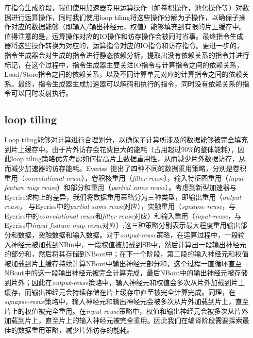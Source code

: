 在指令生成阶段，我们使用加速器专用运算操作（如卷积操作，池化操作等）对数据进行运算操作，同时我们使用loop tiling将这些操作分解为子操作，以确保子操作对应的数据能够（即输入/输出神经元，权值）能够填充到有限的片上缓存中。值得注意的是，运算操作对应的IO操作和访存操作会被同时省事。最终指令生成器将这些操作转换为对应的，运算指令对应的IO指令和访存指令。更进一步的，指令生成器会对生成的指令进行静态依赖分析，提取出没有依赖关系的指令并进行标记，在这个过程中，指令生成器主要关注IO指令与计算指令之间的依赖关系，Load/Store指令之间的依赖关系，以及不同计算单元对应的计算指令之间的依赖关系。最终，指令生成器生成加速器可以解码和执行的指令，同时没有依赖关系的指令可以同时发射执行。

\subsection{loop tiling}

Loop tiling能够对计算进行合理划分，以确保子计算所涉及的数据能够被完全填充到片上缓存中。由于片外访存会花费巨大的能耗（占用超过$90\%$的整体能耗），因此loop tiling策略优先考虑如何提高片上数据重用性，从而减少片外数据访存，从而减少加速器的访存能耗。Eyeriss~\cite{chen2017eyeriss}提出了四种不同的数据重用策略，分别是卷积重用（\emph{convolutional reuse}），卷积核重用（\emph{filter reuse}），输入特征图重用（\emph{input feature map reuse}）和部分和重用（\emph{partial sums reuse}）。考虑到新型加速器与Eyeriss架构上的差异，我们将数据重用策略分为三种类型，即输出重用（\emph{output-reuse}， 与Eyeriss中的\emph{partial sums reuse}对应），突触重用（\emph{synapse-reuse}，与Eyeriss中的\emph{convolutional reuse}和\emph{filter reuse}对应）和输入重用（\emph{input-reuse}，与Eyeriss中\emph{input feature map resue}对应）;这三种策略分别表示最大程度重用输出部分和数据，突触数据和输入数据。对于\emph{output-reuse}策略，在运算过程中，一段输入神经元被加载到NBin中，一段权值被加载到SB中，然后计算出一段输出神经元的部分和，然后将其存储到NBout中；在下一个阶段，第二段的输入神经元和权值被加载到片上缓存持续计算NBout中输出神经元部分和，这个过程一直循环直至NBout中的这一段输出神经元被完全计算完成，最后NBout中的输出神经元被存储到片外；因此在\emph{output-reuse}策略中，输入神经元和权值会多次从片外加载到片上缓存，而输出神经元会持续存储在片上缓存中直至被完全计算完成。同理，在\emph{synapse-resue}策略中，输入神经元和输出神经元会被多次从片外加载到片上，直至片上的权值被完全重用。在\emph{input-reuse}策略中，权值和输出神经元会被多次从片外加载到片上，直至片上的输入神经元被完全重用。因此我们在编译阶段需要探索最佳的数据重用策略，减少片外访存的能耗。

